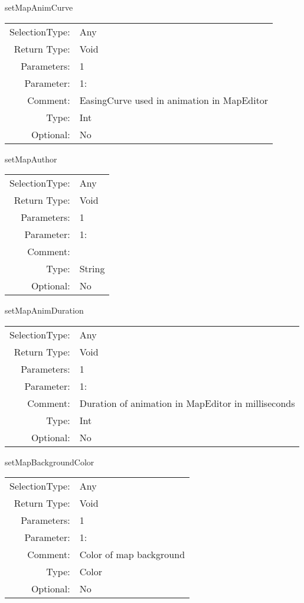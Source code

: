 \item setMapAnimCurve\\
\begin{tabular}{rl}
  SelectionType: & Any\\
    Return Type: & Void\\
     Parameters: & 1\\
   Parameter: &  1:\\
        Comment: & EasingCurve used in animation in MapEditor\\
           Type: & Int\\
       Optional: &  No\\
\end{tabular}

\item setMapAuthor\\
\begin{tabular}{rl}
  SelectionType: & Any\\
    Return Type: & Void\\
     Parameters: & 1\\
   Parameter: &  1:\\
        Comment: & \\
           Type: & String\\
       Optional: &  No\\
\end{tabular}

\item setMapAnimDuration\\
\begin{tabular}{rl}
  SelectionType: & Any\\
    Return Type: & Void\\
     Parameters: & 1\\
   Parameter: &  1:\\
        Comment: & Duration of animation in MapEditor in milliseconds\\
           Type: & Int\\
       Optional: &  No\\
\end{tabular}

\item setMapBackgroundColor\\
\begin{tabular}{rl}
  SelectionType: & Any\\
    Return Type: & Void\\
     Parameters: & 1\\
   Parameter: &  1:\\
        Comment: & Color of map background\\
           Type: & Color\\
       Optional: &  No\\
\end{tabular}

